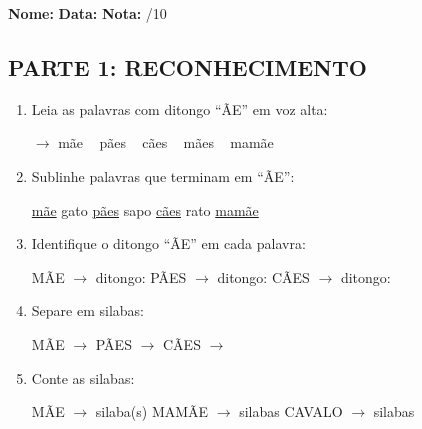 \begin{exercicio}
\noindent\textbf{Nome:} \underline{\hspace{3.2cm}} \quad \textbf{Data:} \underline{\hspace{1.6cm}} \quad \textbf{Nota:} \underline{\hspace{0.9cm}}/10

\subsection*{PARTE 1: RECONHECIMENTO}

\begin{enumerate}
  \item Leia as palavras com ditongo ``\~AE'' em voz alta:
  \begin{center}
  $\rightarrow$ m\~ae  ~  p\~aes  ~  c\~aes  ~  m\~aes  ~  mam\~ae
  \end{center}

  \item Sublinhe palavras que terminam em ``\~AE'':
  \begin{center}
  \uline{m\~ae} \quad gato \quad \uline{p\~aes} \quad sapo \quad \uline{c\~aes} \quad rato \quad \uline{mam\~ae}
  \end{center}

  \item Identifique o ditongo ``\~AE'' em cada palavra:
  \begin{center}
  M\~AE $\rightarrow$ ditongo: \underline{\hspace{1cm}} \quad P\~AES $\rightarrow$ ditongo: \underline{\hspace{1cm}} \quad C\~AES $\rightarrow$ ditongo: \underline{\hspace{1cm}}
  \end{center}

  \item Separe em silabas:
  \begin{center}
  M\~AE $\rightarrow$ \underline{\hspace{1cm}} \quad P\~AES $\rightarrow$ \underline{\hspace{1cm}} \quad C\~AES $\rightarrow$ \underline{\hspace{1cm}} \underline{\hspace{1cm}}
  \end{center}

  \item Conte as silabas:
  \begin{center}
  M\~AE $\rightarrow$ \underline{\hspace{1cm}} silaba(s) \quad MAM\~AE $\rightarrow$ \underline{\hspace{1cm}} silabas \quad CAVALO $\rightarrow$ \underline{\hspace{1cm}} silabas
  \end{center}
\end{enumerate}


\end{exercicio}
